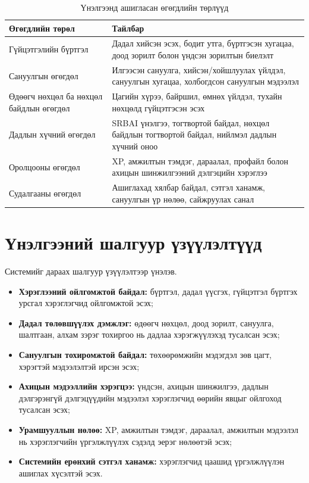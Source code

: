 \begin{table}[htbp]
\centering
\small
\setlength{\tabcolsep}{4pt}
\begin{tabular}{|p{4.0cm}|p{8.8cm}|}
\hline
\textbf{Өгөгдлийн төрөл} & \textbf{Тайлбар} \\ \hline
Гүйцэтгэлийн бүртгэл & Дадал хийсэн эсэх, бодит утга, бүртгэсэн хугацаа, доод зорилт болон үндсэн зорилтын биелэлт \\ \hline
Сануулгын өгөгдөл & Илгээсэн сануулга, хийсэн/хойшлуулах үйлдэл, сануулгын хугацаа, холбогдсон сануулгын мэдээлэл \\ \hline
Өдөөгч нөхцөл ба нөхцөл байдлын өгөгдөл & Цагийн хүрээ, байршил, өмнөх үйлдэл, тухайн нөхцөлд гүйцэтгэсэн эсэх \\ \hline
Дадлын хүчний өгөгдөл & SRBAI үнэлгээ, тогтвортой байдал, нөхцөл байдлын тогтвортой байдал, нийлмэл дадлын хүчний оноо \\ \hline
Оролцооны өгөгдөл & XP, амжилтын тэмдэг, дараалал, профайл болон ахицын шинжилгээний дэлгэцийн хэрэглээ \\ \hline
Судалгааны өгөгдөл & Ашиглахад хялбар байдал, сэтгэл ханамж, сануулгын үр нөлөө, сайжруулах санал \\ \hline
\end{tabular}
\caption{Үнэлгээнд ашигласан өгөгдлийн төрлүүд}
\label{tab:evaluation-data-types}
\end{table}

\section{Үнэлгээний шалгуур үзүүлэлтүүд}

Системийг дараах шалгуур үзүүлэлтээр үнэлэв.

\begin{itemize}
    \item \textbf{Хэрэглээний ойлгомжтой байдал:} бүртгэл, дадал үүсгэх, гүйцэтгэл бүртгэх урсгал хэрэглэгчид ойлгомжтой эсэх;
    \item \textbf{Дадал төлөвшүүлэх дэмжлэг:} өдөөгч нөхцөл, доод зорилт, сануулга, шалтгаан, алхам зэрэг тохиргоо нь дадлаа хэрэгжүүлэхэд тусалсан эсэх;
    \item \textbf{Сануулгын тохиромжтой байдал:} төхөөрөмжийн мэдэгдэл зөв цагт, хэрэгтэй мэдээлэлтэй ирсэн эсэх;
    \item \textbf{Ахицын мэдээллийн хэрэгцээ:} үндсэн, ахицын шинжилгээ, дадлын дэлгэрэнгүй дэлгэцүүдийн мэдээлэл хэрэглэгчид өөрийн явцыг ойлгоход тусалсан эсэх;
    \item \textbf{Урамшууллын нөлөө:} XP, амжилтын тэмдэг, дараалал, амжилтын мэдээлэл нь хэрэглэгчийн үргэлжлүүлэх сэдэлд эерэг нөлөөтэй эсэх;
    \item \textbf{Системийн ерөнхий сэтгэл ханамж:} хэрэглэгчид цаашид үргэлжлүүлэн ашиглах хүсэлтэй эсэх.
\end{itemize}


